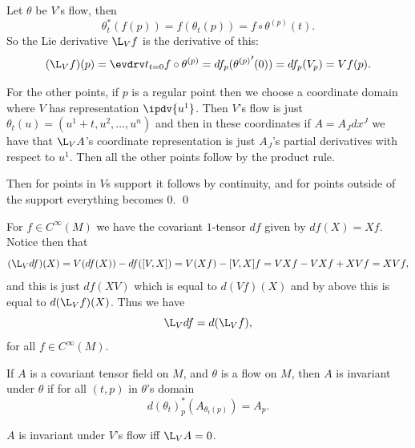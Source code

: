 \eprop

\bproof

    Let $\theta$ be $V$'s flow, then
    $$ \theta_t^*(f(p)) = f(\theta_t(p)) = f\circ\theta^{(p)}(t) . $$
    So the Lie derivative $\L_Vf$ is the derivative of this:
    $$ (\L_Vf)(p) = \evdrv t_{t=0}f\circ\theta^{(p)} = df_p({\theta^{(p)}}'(0)) = df_p(V_p) = Vf(p) . $$

    For the other points, if $p$ is a regular point then we choose a coordinate domain where $V$ has representation $\ipdv{u^1}$.
    Then $V$'s flow is just $\theta_t(u)=(u^1+t,u^2,\dots,u^n)$ and then in these coordinates if $A=A_Jdx^J$ we have that $\L_VA$'s coordinate
    representation is just $A_J$'s partial derivatives with respect to $u^1$.
    Then all the other points follow by the product rule.

    Then for points in $V$s support it follows by continuity, and for points outside of the support everything becomes $0$.
    \qed

\eproof

For $f\in C^\infty(M)$ we have the covariant $1$-tensor $df$ given by $df(X)=Xf$.
Notice then that
$$ (\L_Vdf)(X) = V(df(X)) - df([V,X]) = V(Xf) - [V,X]f = VXf - VXf + XVf = XVf , $$
and this is just $df(XV)$ which is equal to $d(Vf)(X)$ and by above this is equal to $d(\L_Vf)(X)$.
Thus we have
$$ \L_Vdf = d(\L_Vf) , $$
for all $f\in C^\infty(M)$.

\bdefn

    If $A$ is a covariant tensor field on $M$, and $\theta$ is a flow on $M$, then $A$ is {\emphcolor invariant under $\theta$} if for all
    $(t,p)$ in $\theta$'s domain
    $$ d(\theta_t)^*_p(A_{\theta_t(p)}) = A_p . $$

\edefn

\bthrm

    $A$ is invariant under $V$'s flow iff $\L_VA=0$.

\ethrm


